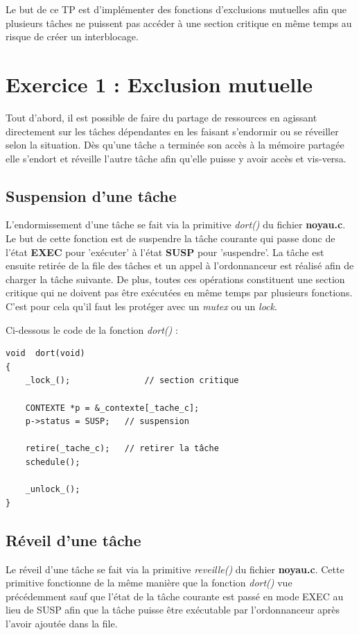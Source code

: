 \documentclass[a4paper,12pt]{report}
\begin{document}
Le but de ce TP est d'implémenter des fonctions d'exclusions mutuelles afin que plusieurs tâches ne puissent pas accéder à une section critique en même temps au risque de créer un interblocage.  


\section{Exercice 1 : Exclusion mutuelle}

Tout d'abord, il est possible de faire du partage de ressources en agissant directement sur les tâches dépendantes en les faisant s'endormir ou se réveiller selon la situation. Dès qu'une tâche a terminée son accès à la mémoire partagée elle s'endort et réveille l'autre tâche afin qu'elle puisse y avoir accès et vis-versa.

\subsection{Suspension d'une tâche}

L'endormissement d'une tâche se fait via la primitive \textit{dort()} du fichier \textbf{noyau.c}.
Le but de cette fonction est de suspendre la tâche courante qui passe donc de l'état \textbf{EXEC} pour 'exécuter' à l'état \textbf{SUSP} pour 'suspendre'. La tâche est ensuite retirée de la file des tâches et un appel à l'ordonnanceur est réalisé afin de charger la tâche suivante. De plus, toutes ces opérations constituent une section critique qui ne doivent pas être exécutées en même temps par plusieurs fonctions. C'est pour cela qu'il faut les protéger avec un \textit{mutex} ou un \textit{lock}.\newline

Ci-dessous le code de la fonction \textit{dort()} :

\begin{lstlisting}
void  dort(void)
{
	_lock_();				// section critique

	CONTEXTE *p = &_contexte[_tache_c];
	p->status = SUSP;	// suspension

	retire(_tache_c);	// retirer la tâche
	schedule();

	_unlock_();
}
\end{lstlisting}

\subsection{Réveil d'une tâche}

Le réveil d'une tâche se fait via la primitive \textit{reveille()} du fichier \textbf{noyau.c}.
Cette primitive fonctionne de la même manière que la fonction \textit{dort()} vue précédemment sauf que l'état de la tâche courante est passé en mode EXEC au lieu de SUSP afin que la tâche puisse être exécutable par l'ordonnanceur après l'avoir ajoutée dans la file.\newline
\end{document}
